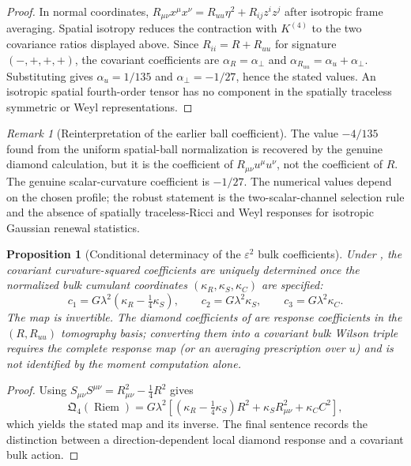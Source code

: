 \documentclass[11pt]{article}
\newtheorem{proposition}[theorem]{Proposition}
\theoremstyle{definition}
\theoremstyle{remark}
\newtheorem{remark}[theorem]{Remark}
\newcommand{\eps}{\varepsilon}
\newcommand{\Riem}{\operatorname{Riem}}
\begin{document}
\begin{proof}
In normal coordinates,
$R_{\mu\nu}x^\mu x^\nu=R_{uu}\eta^2+R_{ij}z^iz^j$ after isotropic frame
averaging.  Spatial isotropy reduces the contraction with
$K^{(4)}$ to the two covariance ratios displayed above.  Since
$R_{ii}=R+R_{uu}$ for signature $(-,+,+,+)$, the covariant coefficients are
$\alpha_R=\alpha_\perp$ and
$\alpha_{R_{uu}}=\alpha_u+\alpha_\perp$.
Substituting  gives
$\alpha_u=1/135$ and $\alpha_\perp=-1/27$, hence the stated values.
An isotropic spatial fourth-order tensor has no component in the spatially
traceless symmetric or Weyl representations.
\end{proof}

\begin{remark}[Reinterpretation of the earlier ball coefficient]
\label{rem:diamond-reinterpretation}
The value $-4/135$ found from the uniform spatial-ball normalization is recovered
by the genuine diamond calculation, but it is the coefficient of
$R_{\mu\nu}u^\mu u^\nu$, not the coefficient of $R$.  The genuine scalar-curvature
coefficient is $-1/27$.  The numerical values depend on the chosen profile;
the robust statement is the two-scalar-channel selection rule and the absence of
spatially traceless-Ricci and Weyl responses for isotropic Gaussian renewal
statistics.
\end{remark}

\begin{proposition}[Conditional determinacy of the $\eps^2$ bulk coefficients]
\label{prop:conditional-wilson}
Under , the covariant curvature-squared
coefficients are uniquely determined once the normalized bulk cumulant
coordinates $(\kappa_R,\kappa_S,\kappa_C)$ are specified:
\[
 c_1=G\lambda^2(\kappa_R-\tfrac14\kappa_S),\qquad
 c_2=G\lambda^2\kappa_S,\qquad
 c_3=G\lambda^2\kappa_C .
\]
The map is invertible.  The diamond coefficients of
 are response coefficients in the
$(R,R_{uu})$ tomography basis; converting them into a covariant bulk Wilson
triple requires the complete response map (or an averaging prescription over
$u$) and is not identified by the moment computation alone.
\end{proposition}

\begin{proof}
Using
$S_{\mu\nu}S^{\mu\nu}=R_{\mu\nu}^2-\tfrac14R^2$ gives
\[
 \mathfrak Q_4(\Riem)=G\lambda^2
 [(\kappa_R-\tfrac14\kappa_S)R^2
 +\kappa_S R_{\mu\nu}^2+\kappa_C C^2],
\]
which yields the stated map and its inverse.  The final sentence records the
distinction between a direction-dependent local diamond response and a covariant
bulk action.
\end{proof}
\end{document}

